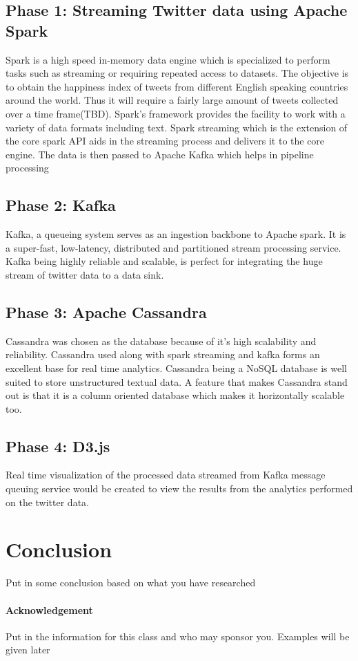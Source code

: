 \documentclass[9pt,twocolumn,twoside]{styles/osajnl}
\begin{document}
\subsection{Phase 1: Streaming Twitter data using Apache Spark}
Spark is a high speed in-memory data engine which is specialized to perform tasks such as streaming or requiring repeated access to datasets. The objective is to obtain the happiness index of tweets from different English speaking countries around the world. Thus it will require a fairly large amount of tweets collected over a time frame(TBD). Spark's framework provides the facility to work with a variety of data formats including text. Spark streaming which is the extension of the core spark API aids in the streaming process and delivers it to the core engine. The data is then passed to Apache Kafka which helps in pipeline processing
\subsection{Phase 2: Kafka}
Kafka, a queueing system serves as an ingestion backbone to Apache spark. It is a super-fast, low-latency, distributed and partitioned stream processing service. Kafka being highly reliable and scalable, is perfect for integrating the huge stream of twitter data to a data sink. 

\subsection{Phase 3: Apache Cassandra}
Cassandra was chosen as the database because of it's high scalability and reliability. Cassandra used along with spark streaming and kafka forms an excellent base for real time analytics. Cassandra being a NoSQL database is well suited to store unstructured textual data. A feature that makes Cassandra stand out is that it is a column oriented database which makes it horizontally scalable too. 

\subsection{Phase 4: D3.js}

Real time visualization of the processed data streamed from Kafka message queuing service would be created to view the results from the analytics performed on the twitter data.


\section{Conclusion}

Put in some conclusion based on what you have researched

\paragraph{Acknowledgement}

Put in the information for this class and who may sponsor
you. Examples will be given later

\end{document}
